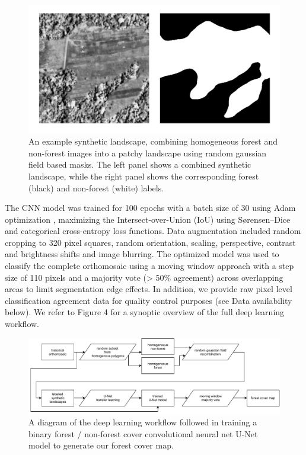 \documentclass[remote sensing,article,submit,moreauthors,pdftex]{mdpi}
\begin{document}
\begin{figure}

{\centering \includegraphics[width=1\linewidth]{./figures/synthetic_landscape} 

}

\caption{An example synthetic landscape, combining homogeneous forest and non-forest images into a patchy landscape using random gaussian field based masks. The left panel shows a combined synthetic landscape, while the right panel shows the corresponding forest (black) and non-forest (white) labels.}\label{fig:unnamed-chunk-4}
\end{figure}

The CNN model was trained for 100 epochs with a batch size of 30 using
Adam optimization \citep{kingma2017}, maximizing the
Intersect-over-Union (IoU) using Sørensen--Dice \citep{dice1945} and
categorical cross-entropy loss functions. Data augmentation included
random cropping to 320 pixel squares, random orientation, scaling,
perspective, contrast and brightness shifts and image blurring. The
optimized model was used to classify the complete orthomosaic using a
moving window approach with a step size of 110 pixels and a majority
vote (\textgreater{} 50\% agreement) across overlapping areas to limit
segmentation edge effects. In addition, we provide raw pixel level
classification agreement data for quality control purposes (see Data
availability below). We refer to Figure 4 for a synoptic overview of the
full deep learning workflow.

\begin{figure}

{\centering \includegraphics[width=1\linewidth]{./figures/cnn_diagram} 

}

\caption{A diagram of the deep learning workflow followed in training a binary forest / non-forest cover convolutional neural net U-Net model to generate our forest cover map.}\label{fig:unnamed-chunk-5}
\end{figure}
\end{document}
